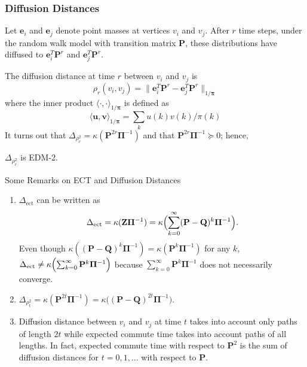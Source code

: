 \documentclass[professionalfonts, hyperref={pdfpagelabels=false,
  colorlinks=true, linkcolor=purple}]{beamer}
\begin{document}
\begin{frame}
  \frametitle{Diffusion Distances}
  Let $\bm{e}_i$ and $\bm{e}_j$ denote point masses at vertices $v_i$ and
  $v_j$. After $r$ time steps, under the random walk model with
  transition matrix $\mathbf{P}$, these distributions have diffused to
  $\bm{e}_i^{T} \mathbf{P}^{r}$ and $\bm{e}_j^{T}\mathbf{P}^{r}$. 
  
  \vskip10pt 

  The diffusion distance \cite{coifman06:_diffus_maps} at
  time $r$ between $v_i$ and $v_j$ is
    \begin{equation*}
      \rho_{r}(v_i,v_j) = \| \bm{e}_i^{T} \mathbf{P}^{r} -
      \bm{e}_j^{T}
      \mathbf{P}^{r} \|_{1/\bm{\pi}}
    \end{equation*}
    where the inner product $\langle \cdot, \cdot
    \rangle_{1/\bm{\pi}}$ is defined as
    \begin{equation*}
      \langle \bm{u}, \bm{v} \rangle_{1/\bm{\pi}} = \sum_{k} u(k)
      v(k)/\pi(k)
    \end{equation*}
    It turns out that $\Delta_{\rho_{r}^{2}} =
    \kappa(\mathbf{P}^{2r}\bm{\Pi}^{-1})$ and that
    $\mathbf{P}^{2r}\bm{\Pi}^{-1} \succeq 0$; hence,

    \vskip10pt \alert{$\Delta_{\rho_{r}^{2}}$ is EDM-2}.
\end{frame}

\begin{frame}{Some Remarks on ECT and Diffusion
  Distances}
  \begin{enumerate}
  \item $\Delta_{\mathrm{ect}}$ can be written as
    \begin{equation*}
      \Delta_{\mathrm{ect}} = \kappa(\mathbf{Z}\bm{\Pi}^{-1}) =
      \kappa\Bigl( \sum_{k=0}^{\infty}(\mathbf{P} -
      \mathbf{Q})^{k}\bm{\Pi}^{-1}\Bigr).
    \end{equation*}
    Even though $\kappa((\mathbf{P} - \mathbf{Q})^{k}\bm{\Pi}^{-1}) =
    \kappa(\mathbf{P}^{k}\bm{\Pi}^{-1})$ for any $k$, 
    $\Delta_{\mathrm{ect}} \not =
    \kappa\Bigl(\sum_{k=0}^{\infty}\mathbf{P}^{k}\bm{\Pi}^{-1}\Bigr)$
    because $\sum_{k=0}^{\infty}\mathbf{P}^{k}\bm{\Pi}^{-1}$ does not
    necessarily converge. 
  \item \vskip5pt $\Delta_{\rho_{t}^{2}} =
    \kappa(\mathbf{P}^{2t}\bm{\Pi}^{-1}) = \kappa\bigl((\mathbf{P} -
    \mathbf{Q})^{2t}\bm{\Pi}^{-1}\bigr)$. 
  \item \vskip5pt Diffusion distance between $v_i$ and $v_j$ at time
    $t$ takes into account only paths of length $2t$ while expected commute time
    takes into account paths of all lengths. In fact, expected commute
    time with respect to $\mathbf{P}^{2}$ is the sum of diffusion
    distances for $t = 0,1,\dots$ with respect to $\mathbf{P}$.
  \end{enumerate}
\end{frame}
\end{document}
